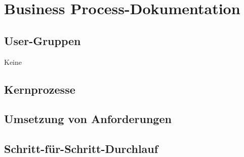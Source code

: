 \section{Business Process-Dokumentation}

\subsection{User-Gruppen}
Keine

\subsection{Kernprozesse}

\subsection{Umsetzung von Anforderungen}

\subsection{Schritt-für-Schritt-Durchlauf}


 
